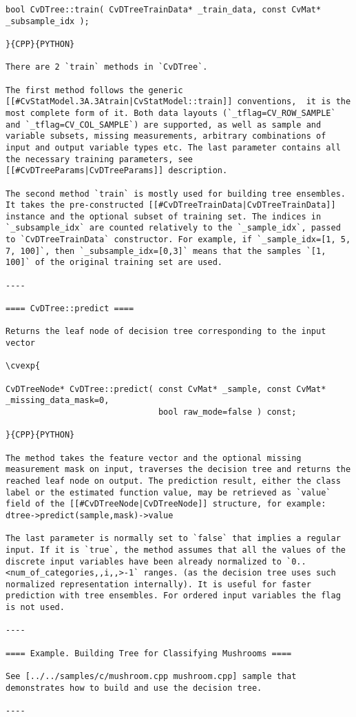 \begin{verbatim}
bool CvDTree::train( CvDTreeTrainData* _train_data, const CvMat* _subsample_idx );

}{CPP}{PYTHON}

There are 2 `train` methods in `CvDTree`.

The first method follows the generic [[#CvStatModel.3A.3Atrain|CvStatModel::train]] conventions,  it is the most complete form of it. Both data layouts (`_tflag=CV_ROW_SAMPLE` and `_tflag=CV_COL_SAMPLE`) are supported, as well as sample and variable subsets, missing measurements, arbitrary combinations of input and output variable types etc. The last parameter contains all the necessary training parameters, see [[#CvDTreeParams|CvDTreeParams]] description.

The second method `train` is mostly used for building tree ensembles. It takes the pre-constructed [[#CvDTreeTrainData|CvDTreeTrainData]] instance and the optional subset of training set. The indices in `_subsample_idx` are counted relatively to the `_sample_idx`, passed to `CvDTreeTrainData` constructor. For example, if `_sample_idx=[1, 5, 7, 100]`, then `_subsample_idx=[0,3]` means that the samples `[1, 100]` of the original training set are used.

----

==== CvDTree::predict ====

Returns the leaf node of decision tree corresponding to the input vector

\cvexp{

CvDTreeNode* CvDTree::predict( const CvMat* _sample, const CvMat* _missing_data_mask=0,
                               bool raw_mode=false ) const;

}{CPP}{PYTHON}

The method takes the feature vector and the optional missing measurement mask on input, traverses the decision tree and returns the reached leaf node on output. The prediction result, either the class label or the estimated function value, may be retrieved as `value` field of the [[#CvDTreeNode|CvDTreeNode]] structure, for example: dtree->predict(sample,mask)->value

The last parameter is normally set to `false` that implies a regular input. If it is `true`, the method assumes that all the values of the discrete input variables have been already normalized to `0..<num_of_categories,,i,,>-1` ranges. (as the decision tree uses such normalized representation internally). It is useful for faster prediction with tree ensembles. For ordered input variables the flag is not used.

----

==== Example. Building Tree for Classifying Mushrooms ====

See [../../samples/c/mushroom.cpp mushroom.cpp] sample that demonstrates how to build and use the decision tree.

----

\end{verbatim}
